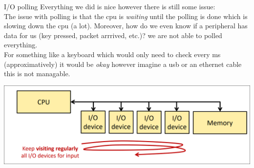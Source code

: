 	

\begin{parag}{I/O polling}
    Everything we did is nice however there is still some issue: \\ The issue with polling is that the cpu is \textit{waiting} until the polling is done which is slowing down the cpu (a lot). Moreover, how do we even know if a peripheral has data for us (key pressed, packet arrrived, etc.)? we are not able to polled everything. \\
	For something like a keyboard which would only need to check every ms (approximatively) it would be \textit{okay} however imagine a usb or an ethernet cable this is not managable.
	\begin{center}
	\includegraphics[scale=0.2]{screenshots/2025-10-22_11.png}
	\end{center}
\end{parag}


